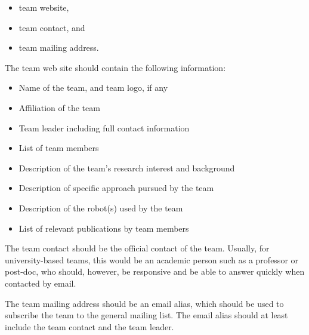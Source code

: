 \begin{itemize}
	\item team website,
	\item team contact, and
	\item team mailing address.
\end{itemize}

The team web site should contain the following information:

\begin{itemize}
	\item Name of the team, and team logo, if any
	\item Affiliation of the team
	\item Team leader including full contact information
	\item List of team members
	\item Description of the team's research interest and background
	\item Description of specific approach pursued by the team
	\item Description of the robot(s) used by the team
	\item List of relevant publications by team members

\end{itemize}

The team contact should be the official contact of the team. Usually, for university-based teams, this would be an academic person such as a professor or post-doc, who should, however, be responsive and be able to answer quickly when contacted by email.
\par
The team mailing address should be an email alias, which should be used to subscribe the team to the general \RCAW mailing list. The email alias should at least include the team contact and the team leader.

